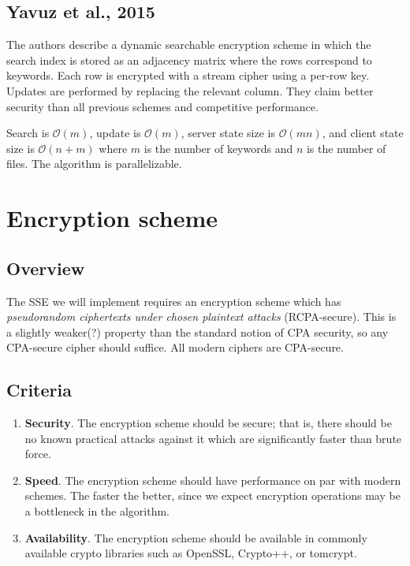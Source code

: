 \subsection{Yavuz et al., 2015}

\cite{yavuz15} 

The authors describe a dynamic searchable encryption scheme in which the search index is stored as an adjacency matrix where the rows correspond to keywords. Each row is encrypted with a stream cipher using a per-row key.
Updates are performed by replacing the relevant column.
They claim better security than all previous schemes and competitive performance.

Search is $\mathcal{O}(m)$, update is $\mathcal{O}(m)$, server state size is $\mathcal{O}(mn)$, and client state size is $\mathcal{O}(n+m)$ where $m$ is the number of keywords and $n$ is the number of files. The algorithm is parallelizable.


\section{ Encryption scheme }

\subsection{ Overview }

The SSE we will implement requires an encryption scheme which has \textit{pseudorandom ciphertexts under chosen plaintext attacks} (RCPA-secure).
This is a slightly weaker(?) property than the standard notion of CPA security,
so any CPA-secure cipher should suffice. All modern ciphers are CPA-secure.


\subsection{ Criteria }

\begin{enumerate}
  \item \textbf{Security}.
  The encryption scheme should be secure; that is, there should be no known practical attacks against it which are significantly faster than brute force.

  \item \textbf{Speed}.
  The encryption scheme should have performance on par with modern schemes. The faster the better, since we expect encryption operations may be a bottleneck in the algorithm.

  \item \textbf{Availability}.
  The encryption scheme should be available in commonly available crypto libraries such as OpenSSL, Crypto++, or tomcrypt.

\end{enumerate}

